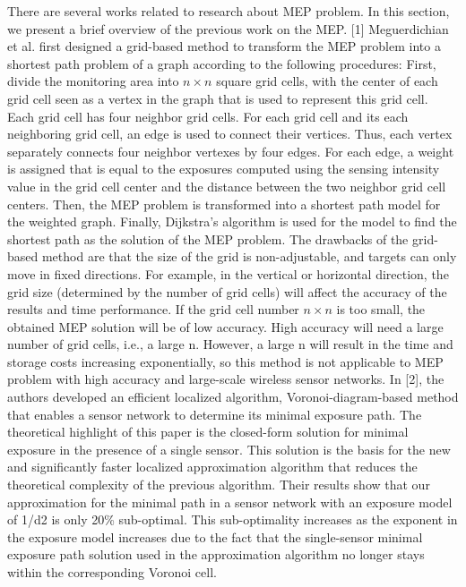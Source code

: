 \documentclass[final]{elsarticle}
\begin{document}
There are several works related to research about MEP problem. In this section, we present a brief overview of the previous work on the MEP. 
[1] Meguerdichian et al. first designed a grid-based method to transform the MEP problem into a shortest path problem of a graph according to the following procedures: First, divide the monitoring area into $ n\times n $ square grid cells, with the center of each grid cell seen as a vertex in the graph that is used to represent this grid cell. Each grid cell has four neighbor grid cells. For each grid cell and its each neighboring grid cell, an edge is used to connect their vertices. Thus, each vertex separately connects four neighbor vertexes by four edges. For each edge, a weight is assigned that is equal to the exposures computed using the sensing intensity value in the grid cell center and the distance between the two neighbor grid cell centers. Then, the MEP problem is transformed into a shortest path model for the weighted graph. Finally, Dijkstra's algorithm is used for the model to find the shortest path as the solution of the MEP problem. The drawbacks of the grid-based method are that the size of the grid is non-adjustable, and targets can only move in fixed directions. For example, in the vertical or horizontal direction, the grid size (determined by the number of grid cells) will affect the accuracy of the results and time performance. If the grid cell number $ n \times n $ is too small, the obtained MEP solution will be of low accuracy. High accuracy will need a large number of grid cells, i.e., a large n. However, a large n will result in the time and storage costs increasing exponentially, so this method is not applicable to MEP problem with high accuracy and large-scale wireless sensor networks. 
In [2], the authors developed an efficient localized algorithm, Voronoi-diagram-based method that enables a sensor network to determine its minimal exposure path. The theoretical highlight of this paper is the closed-form solution for minimal exposure in the presence of a single sensor. This solution is the basis for the new and significantly faster localized approximation algorithm that reduces the theoretical complexity of the previous algorithm. Their results show that our approximation for the minimal path in a sensor network with an exposure model of 1/d2 is only 20\% sub-optimal. This sub-optimality increases as the exponent in the exposure model increases due to the fact that the single-sensor minimal exposure path solution used in the approximation algorithm no longer stays within the corresponding Voronoi cell. 
\end{document}
